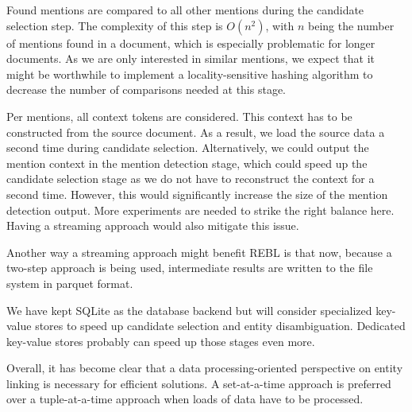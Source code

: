 Found mentions are compared to all other mentions during the candidate selection step. The complexity of this step is $O(n^2)$, with $n$ being the number of mentions found in a document, which is especially problematic for longer documents. As we are only interested in similar mentions, we expect that it might be worthwhile to implement a locality-sensitive hashing algorithm to decrease the number of comparisons needed at this stage. 

Per mentions, all context tokens are considered. This context has to be constructed from the source document. As a result, we load the source data a second time during candidate selection. Alternatively, we could output the mention context in the mention detection stage, which could speed up the candidate selection stage as we do not have to reconstruct the context for a second time. However, this would significantly increase the size of the mention detection output. More experiments are needed to strike the right balance here. Having a streaming approach would also mitigate this issue. 

Another way a streaming approach might benefit REBL is that now, because a two-step approach is being used, intermediate results are written to the file system in parquet format. 

We have kept SQLite as the database backend but will consider specialized key-value stores to speed up candidate selection and entity disambiguation. Dedicated key-value stores probably can speed up those stages even more. 

Overall, it has become clear that a data processing-oriented perspective on entity linking is necessary for efficient solutions. A set-at-a-time approach is preferred over a tuple-at-a-time approach when loads of data have to be processed. 